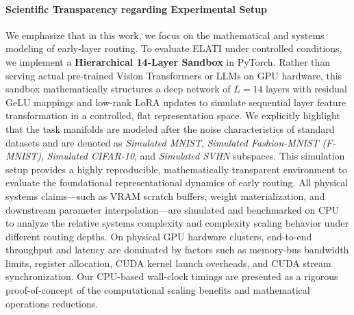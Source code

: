 \paragraph{Scientific Transparency regarding Experimental Setup}
We emphasize that in this work, we focus on the mathematical and systems modeling of early-layer routing.
To evaluate ELATI under controlled conditions, we implement a \textbf{Hierarchical 14-Layer Sandbox} in PyTorch.
Rather than serving actual pre-trained Vision Transformers or LLMs on GPU hardware, this sandbox mathematically structures a deep network of $L = 14$ layers with residual GeLU mappings and low-rank LoRA updates to simulate sequential layer feature transformation in a controlled, flat representation space.
We explicitly highlight that the task manifolds are modeled after the noise characteristics of standard datasets and are denoted as \emph{Simulated MNIST}, \emph{Simulated Fashion-MNIST (F-MNIST)}, \emph{Simulated CIFAR-10}, and \emph{Simulated SVHN} subspaces. This simulation setup provides a highly reproducible, mathematically transparent environment to evaluate the foundational representational dynamics of early routing.
All physical systems claims---such as VRAM scratch buffers, weight materialization, and downstream parameter interpolation---are simulated and benchmarked on CPU to analyze the relative systems complexity and complexity scaling behavior under different routing depths. On physical GPU hardware clusters, end-to-end throughput and latency are dominated by factors such as memory-bus bandwidth limits, register allocation, CUDA kernel launch overheads, and CUDA stream synchronization. Our CPU-based wall-clock timings are presented as a rigorous proof-of-concept of the computational scaling benefits and mathematical operations reductions.

